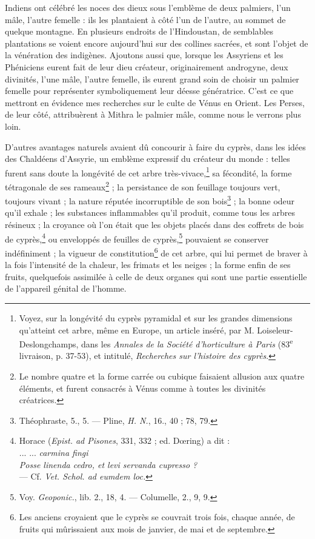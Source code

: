 \documentclass[a4paper, 11pt, oneside, polutonikogreek, french]{article}
\begin{document}
Indiens ont célébré les noces des dieux sous l'emblème de deux palmiers, l'un mâle, l'autre femelle : ils les plantaient à côté l'un de l'autre, au sommet de quelque montagne. En plusieurs endroits de l'Hindoustan, de semblables plantations se voient encore aujourd'hui sur des collines sacrées, et sont l'objet de la vénération des indigènes. Ajoutons aussi que, lorsque les Assyriens et les Phéniciens eurent fait de leur dieu créateur, originairement androgyne, deux divinités, l'une mâle, l'autre femelle, ils eurent grand soin de choisir un palmier femelle pour représenter symboliquement leur déesse génératrice. C'est ce que mettront en évidence mes recherches sur le culte de Vénus en Orient. Les Perses, de leur côté, attribuèrent à Mithra le palmier mâle, comme nous le verrons plus loin.

D'autres avantages naturels avaient dû concourir à faire du cyprès, dans les idées des Chaldéens d'Assyrie, un emblème expressif du créateur du monde : telles furent sans doute la longévité de cet arbre très-vivace,\footnote{Voyez, sur la longévité du cyprès pyramidal et sur les grandes dimensions qu'atteint cet arbre, même en Europe, un article inséré, par M. Loiseleur-Deslongchamps, dans les \emph{Annales de la Société d'horticulture à Paris} (83\textsuperscript{e} livraison, p. 37-53), et intitulé, \emph{Recherches sur l'histoire des cyprès}.} sa fécondité, la forme tétragonale de ses rameaux\footnote{Le nombre quatre et la forme carrée ou cubique faisaient allusion aux quatre éléments, et furent consacrés à Vénus comme à toutes les divinités créatrices.} ; la persistance de son feuillage toujours vert, toujours vivant ; la nature réputée incorruptible de son bois\footnote{Théophraste, 5., 5. --- Pline, \emph{H. N.}, 16., 40 ; 78, 79.} ; la bonne odeur qu'il exhale ; les substances inflammables qu'il produit, comme tous les arbres résineux ; la croyance où l'on était que les objets placés dans des coffrets de bois de cyprès,\footnote{Horace (\emph{Epist. ad Pisones}, 331, 332 ; ed. Dœring) a dit :\\\hspace*{10mm}... ... \emph{carmina fingi}\\\hspace*{10mm}\emph{Posse linenda cedro, et levi servanda cupresso ?}\\\hspace*{5mm}--- Cf. \emph{Vet. Schol. ad eumdem loc.}} ou enveloppés de feuilles de cyprès,\footnote{Voy. \emph{Geoponic.}, lib. 2., 18, 4. --- Columelle, 2., 9, 9.} pouvaient se conserver indéfiniment ; la vigueur de constitution\footnote{Les anciens croyaient que le cyprès se couvrait trois fois, chaque année, de fruits qui mûrissaient aux mois de janvier, de mai et de septembre.} de cet arbre, qui lui permet de braver à la fois l'intensité de la chaleur, les frimats et les neiges ; la forme enfin de ses fruits, quelquefois assimilée à celle de deux organes qui sont une partie essentielle de l'appareil génital de l'homme.
\end{document}

